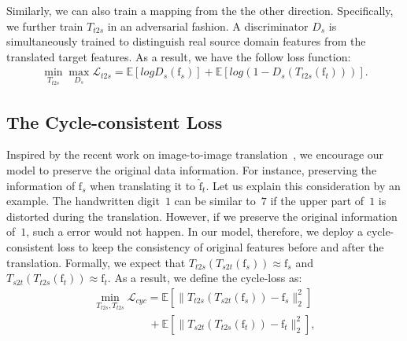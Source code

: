 \documentclass[sigconf]{acmart}
\begin{document}
Similarly, we can also train a mapping from the the other direction. Specifically, we further train $T_{t2s}$ in an adversarial fashion. A discriminator $D_s$ is simultaneously trained to distinguish real source domain features from the translated target features. As a result, we have the follow loss function:
\begin{equation}
\label{eq:tt2s}
  \begin{array}{l}
 \min\limits_{T_{t2s}}\max\limits_{D_s} \mathcal{L}_{t2s}= \mathbb{E}[logD_s(\mathrm{f}_s)]+\mathbb{E}[log(1-D_s(T_{t2s}(\mathrm{f}_t)))].
\end{array} 
\end{equation} 

\subsection{The Cycle-consistent Loss}
Inspired by the recent work on image-to-image translation~\cite{zhu2017unpaired}, we encourage our model to preserve the original data information. For instance, preserving the information of $\mathrm{f}_s$ when translating it to $\hat{\mathrm f}_t$. Let us explain this consideration by an example. The handwritten digit~$1$ can be similar to~$7$ if the upper part of~$1$ is distorted during the translation. However, if we preserve the original information of~$1$, such a error would not happen. In our model, therefore, we deploy a cycle-consistent loss to keep the consistency of original features before and after the translation. Formally, we expect that $T_{t2s}(T_{s2t}(\mathrm{f}_s))\approx \mathrm{f}_s$ and $T_{s2t}(T_{t2s}(\mathrm{f}_t))\approx \mathrm{f}_t$. As a result, we define the cycle-loss as:
\begin{equation}
\label{eq:tt2s}
  \begin{array}{l}
 \min\limits_{T_{t2s},T_{t2s}} \mathcal{L}_{cyc}= \mathbb{E}[\|T_{t2s}(T_{s2t}(\mathrm{f}_s))-\mathrm{f}_s\|_2^2] \\ \hspace{60pt}+\mathbb{E}[\|T_{s2t}(T_{t2s}(\mathrm{f}_t))-\mathrm{f}_t\|_2^2],
\end{array} 
\end{equation} 
\end{document}
